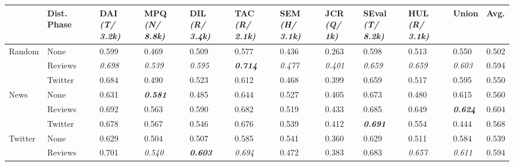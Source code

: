 \begin{table}[]

	\small
	\centering
	
	\begin{adjustbox}{max width=\textwidth}
		
		\begin{tabular}{l|l|l|l|l|l|l|l|l|l|l||l|}
			& Dist. Phase 
			&  \specialcell{DAI \\\textit{(T/ 3.2k)}}
			&  \specialcell{MPQ \\\textit{(N/ 8.8k)}}
			&  \specialcell{DIL \\\textit{(R/ 3.4k)}}
			&  \specialcell{TAC \\\textit{(R/ 2.1k)}}
			&  \specialcell{SEM \\\textit{(H/ 3.1k)}}
			&  \specialcell{JCR \\\textit{(Q/ 1k)}}
			&  \specialcell{SEval \\\textit{(T/ 8.2k)}}
			&  \specialcell{HUL \\\textit{(R/ 3.1k)}}
			&  Union
			&  Avg.  \\
			\hline
			\multirow{3}{*}{Random}
			& None 		& 0.599 		& 0.469 		& 0.509 		& 0.577 					& 0.436 		& 0.263 		& 0.598 		& 0.513 		& 0.550& 0.502\\
			& Reviews	& \textit{0.698}& \textit{0.539}& \textit{0.595}& \textbf{\textit{0.714}} 	& \textit{0.477}& \textit{0.401}& \textit{0.659}& \textit{0.659}& \textit{0.603}& 0.594\\
			& Twitter 	& 0.684 		& 0.490 		& 0.523 		& 0.612 					& 0.468 		& 0.399 		& 0.659 		& 0.517 		& 0.595&0.550\\
			\hline
			\multirow{3}{*}{News}
			& None 		&  0.631 			& \textbf{\textit{0.581}}& 0.485 		 & 0.644 		  & 0.527 		   & 0.405 			& 0.673 				& 0.480 		 & 0.615&0.560\\
			& Reviews 	&  0.692 & 0.563 				 & 0.590 & 0.682 & 0.519 		   & 0.433 & 0.685 		& 0.649 & \textbf{\textit{0.624}}& 0.604\\
			& Twitter 	&  0.678 			& 0.567 				 & 0.546 		 & 0.676 		  & 0.539 & 0.412 			& \textbf{\textit{0.691}}& 0.554 		 & 0.444&0.568 \\
			\hline
			\multirow{3}{*}{Twitter} 
			& None 		&  0.629 & 0.504 & 0.507 & 0.585 & 0.541 & 0.360 & 0.629 & 0.511 & 0.584& 0.539\\
			& Reviews 	&  0.701 & \textit{0.540} & \textbf{\textit{0.603}} & \textit{0.694} & 0.472 & 0.383 & 0.683 & \textit{0.657} & \textit{0.611}& 0.594\\

\end{tabular}
\end{adjustbox}
\end{table}
